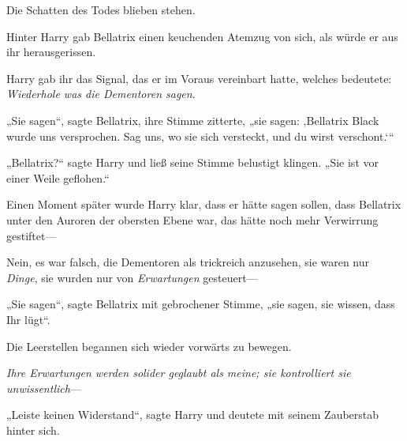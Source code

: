Die Schatten des Todes blieben stehen.

Hinter Harry gab Bellatrix einen keuchenden Atemzug von sich, als würde er aus ihr herausgerissen.

Harry gab ihr das Signal, das er im Voraus vereinbart hatte, welches bedeutete: \emph{Wiederhole was die Dementoren sagen}.

„Sie sagen“, sagte Bellatrix, ihre Stimme zitterte, „sie sagen: ‚Bellatrix Black wurde uns versprochen. Sag uns, wo sie sich versteckt, und du wirst verschont.‘“

„Bellatrix?“ sagte Harry und ließ seine Stimme belustigt klingen. „Sie ist vor einer Weile geflohen.“

Einen Moment später wurde Harry klar, dass er hätte sagen sollen, dass Bellatrix unter den Auroren der obersten Ebene war, das hätte noch mehr Verwirrung gestiftet—

Nein, es war falsch, die Dementoren als trickreich anzusehen, sie waren nur \emph{Dinge}, sie wurden nur von \emph{Erwartungen} gesteuert—

„Sie sagen“, sagte Bellatrix mit gebrochener Stimme, „sie sagen, sie wissen, dass Ihr lügt“.

Die Leerstellen begannen sich wieder vorwärts zu bewegen.

\emph{Ihre Erwartungen werden solider geglaubt als meine; sie kontrolliert sie unwissentlich}—

„Leiste keinen Widerstand“, sagte Harry und deutete mit seinem Zauberstab hinter sich.

